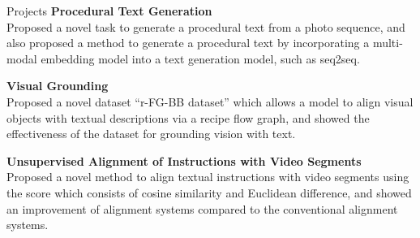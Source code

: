 \begin{rSection}{Projects}
{\bf Procedural Text Generation} \\
Proposed a novel task to generate a procedural text from a photo sequence, and also proposed a method to generate a procedural text by incorporating a multi-modal embedding model into a text generation model, such as seq2seq.

{\bf Visual Grounding}\\
Proposed a novel dataset ``r-FG-BB dataset'' which allows a model to align visual objects with textual descriptions via a recipe flow graph, and showed the effectiveness of the dataset for grounding vision with text.

{\bf Unsupervised Alignment of Instructions with Video Segments}\\
Proposed a novel method to align textual instructions with video segments using the score which consists of cosine similarity and Euclidean difference, and showed an improvement of alignment systems compared to the conventional alignment systems.
\end{rSection}